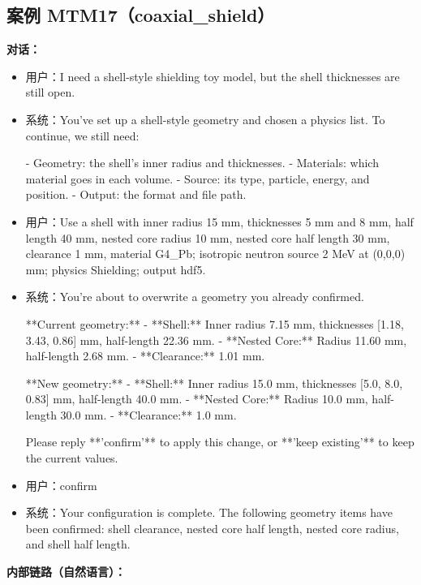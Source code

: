 \documentclass[11pt]{ctexart}
\begin{document}
\subsection{案例 MTM17（coaxial\_shield）}
\textbf{对话：}
\begin{itemize}
\item 用户：I need a shell-style shielding toy model, but the shell thicknesses are still open.
\item 系统：You've set up a shell-style geometry and chosen a physics list. To continue, we still need:

- Geometry: the shell's inner radius and thicknesses.
- Materials: which material goes in each volume.
- Source: its type, particle, energy, and position.
- Output: the format and file path.
\item 用户：Use a shell with inner radius 15 mm, thicknesses 5 mm and 8 mm, half length 40 mm, nested core radius 10 mm, nested core half length 30 mm, clearance 1 mm, material G4\_Pb; isotropic neutron source 2 MeV at (0,0,0) mm; physics Shielding; output hdf5.
\item 系统：You're about to overwrite a geometry you already confirmed.

**Current geometry:**
- **Shell:** Inner radius 7.15 mm, thicknesses [1.18, 3.43, 0.86] mm, half-length 22.36 mm.
- **Nested Core:** Radius 11.60 mm, half-length 2.68 mm.
- **Clearance:** 1.01 mm.

**New geometry:**
- **Shell:** Inner radius 15.0 mm, thicknesses [5.0, 8.0, 0.83] mm, half-length 40.0 mm.
- **Nested Core:** Radius 10.0 mm, half-length 30.0 mm.
- **Clearance:** 1.0 mm.

Please reply **'confirm'** to apply this change, or **'keep existing'** to keep the current values.
\item 用户：confirm
\item 系统：Your configuration is complete. The following geometry items have been confirmed: shell clearance, nested core half length, nested core radius, and shell half length.
\end{itemize}
\textbf{内部链路（自然语言）：}
\end{document}
